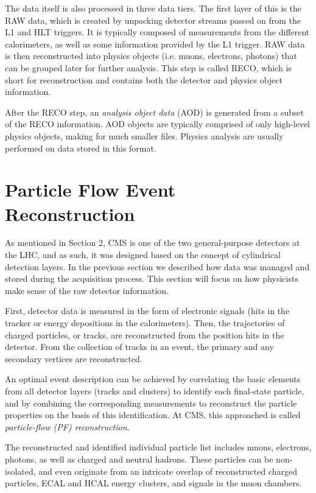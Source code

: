  The data itself is also processed in three data tiers. The first layer of this is the RAW data, which is created by unpacking detector streams passed on from the L1 and HLT triggers. It is typically composed of measurements from the different calorimeters, as well as some information provided by the L1 trigger. RAW data is then reconstructed into physics objects (i.e. muons, electrons, photons) that can be grouped later for further analysis. This step is called RECO, which is short for reconstruction and contains both the detector and physics object information. 

 After the RECO step, an \textit{analysis object data} (AOD) is generated from a subset of the RECO information. AOD objects are typically comprised of only high-level physics objects, making for much smaller files. Physics analysis are usually performed on data stored in this format.



\section{Particle Flow Event Reconstruction}
\label{sec:track}

As mentioned in Section 2, CMS is one of the two general-purpose detectors at the LHC, and as such, it was designed based on the concept of cylindrical detection layers. In the previous section we described how data was managed and stored during the acquisition process. This section will focus on how physicists make sense of the raw detector information.  

First, detector data is measured in the form of electronic signals (hits in the tracker or energy depositions in the calorimeters). Then, the trajectories of charged particles, or tracks, are reconstructed from the position hits in the detector. From the collection of tracks in an event, the primary and any secondary vertices are reconstructed. 

An optimal event description can be achieved by correlating the basic elements from all detector layers (tracks and clusters) to identify each final-state particle, and by combining the corresponding measurements to reconstruct the particle properties on the basis of this identification. At CMS, this approached is called \textit{particle-flow (PF) reconstruction}.

The reconstructed and identified individual particle list includes muons, electrons, photons, as well as charged  and neutral hadrons. These particles can be non-isolated, and even originate from an intricate overlap of reconstructed charged particles, ECAL and HCAL energy clusters, and signals in the muon chambers.

